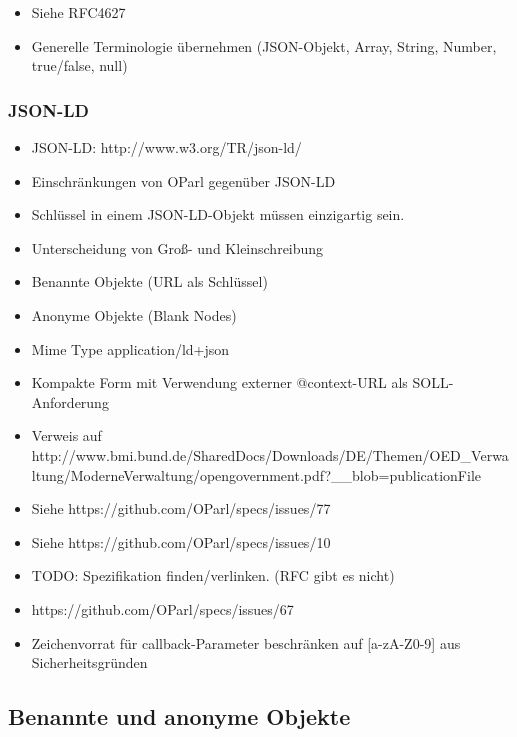 \documentclass[,a4paper]{article}
\begin{document}
\begin{itemize}
\item
  Siehe RFC4627
\item
  Generelle Terminologie übernehmen (JSON-Objekt, Array, String, Number,
  true/false, null)
\end{itemize}

\subsubsection{JSON-LD}

\begin{itemize}
\item
  JSON-LD: http://www.w3.org/TR/json-ld/
\item
  Einschränkungen von OParl gegenüber JSON-LD
\item
  Schlüssel in einem JSON-LD-Objekt müssen einzigartig sein.
\item
  Unterscheidung von Groß- und Kleinschreibung
\item
  Benannte Objekte (URL als Schlüssel)
\item
  Anonyme Objekte (Blank Nodes)
\item
  Mime Type application/ld+json
\item
  Kompakte Form mit Verwendung externer @context-URL als
  SOLL-Anforderung
\item
  Verweis auf
  http://www.bmi.bund.de/SharedDocs/Downloads/DE/Themen/OED\_Verwaltung/ModerneVerwaltung/opengovernment.pdf?\_\_blob=publicationFile
\item
  Siehe https://github.com/OParl/specs/issues/77
\item
  Siehe https://github.com/OParl/specs/issues/10
\end{itemize}


\begin{itemize}
\item
  TODO: Spezifikation finden/verlinken. (RFC gibt es nicht)
\item
  https://github.com/OParl/specs/issues/67
\item
  Zeichenvorrat für callback-Parameter beschränken auf {[}a-zA-Z0-9{]}
  aus Sicherheitsgründen
\end{itemize}

\subsection{Benannte und anonyme Objekte}
\end{document}
